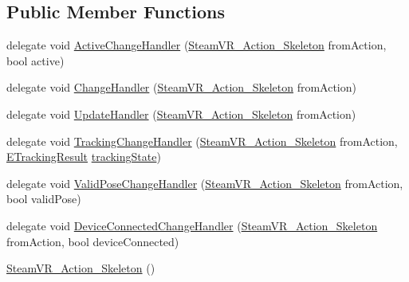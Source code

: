 \subsection*{Public Member Functions}
\begin{DoxyCompactItemize}
\item 
delegate void \mbox{\hyperlink{class_valve_1_1_v_r_1_1_steam_v_r___action___skeleton_ae329ff2582f41c7ec52ecdf3b34b345a}{Active\+Change\+Handler}} (\mbox{\hyperlink{class_valve_1_1_v_r_1_1_steam_v_r___action___skeleton}{Steam\+V\+R\+\_\+\+Action\+\_\+\+Skeleton}} from\+Action, bool active)
\item 
delegate void \mbox{\hyperlink{class_valve_1_1_v_r_1_1_steam_v_r___action___skeleton_a41a68545cb313ef9f47600d9e9022177}{Change\+Handler}} (\mbox{\hyperlink{class_valve_1_1_v_r_1_1_steam_v_r___action___skeleton}{Steam\+V\+R\+\_\+\+Action\+\_\+\+Skeleton}} from\+Action)
\item 
delegate void \mbox{\hyperlink{class_valve_1_1_v_r_1_1_steam_v_r___action___skeleton_a9fd666c2f3ccefc435275d85c525337c}{Update\+Handler}} (\mbox{\hyperlink{class_valve_1_1_v_r_1_1_steam_v_r___action___skeleton}{Steam\+V\+R\+\_\+\+Action\+\_\+\+Skeleton}} from\+Action)
\item 
delegate void \mbox{\hyperlink{class_valve_1_1_v_r_1_1_steam_v_r___action___skeleton_a460bcda41aa359ec14435212bed2b856}{Tracking\+Change\+Handler}} (\mbox{\hyperlink{class_valve_1_1_v_r_1_1_steam_v_r___action___skeleton}{Steam\+V\+R\+\_\+\+Action\+\_\+\+Skeleton}} from\+Action, \mbox{\hyperlink{namespace_valve_1_1_v_r_abe6feab98f33191b7c27b4292012e90a}{E\+Tracking\+Result}} \mbox{\hyperlink{class_valve_1_1_v_r_1_1_steam_v_r___action___pose___base_af04d371ae8e8552385b022d1aa788d32}{tracking\+State}})
\item 
delegate void \mbox{\hyperlink{class_valve_1_1_v_r_1_1_steam_v_r___action___skeleton_af5ad5e815b7f555aa33ee8b74385e89e}{Valid\+Pose\+Change\+Handler}} (\mbox{\hyperlink{class_valve_1_1_v_r_1_1_steam_v_r___action___skeleton}{Steam\+V\+R\+\_\+\+Action\+\_\+\+Skeleton}} from\+Action, bool valid\+Pose)
\item 
delegate void \mbox{\hyperlink{class_valve_1_1_v_r_1_1_steam_v_r___action___skeleton_a737d68e8f67790bf838b4f5bac3ffae1}{Device\+Connected\+Change\+Handler}} (\mbox{\hyperlink{class_valve_1_1_v_r_1_1_steam_v_r___action___skeleton}{Steam\+V\+R\+\_\+\+Action\+\_\+\+Skeleton}} from\+Action, bool device\+Connected)
\item 
\mbox{\hyperlink{class_valve_1_1_v_r_1_1_steam_v_r___action___skeleton_ab6d11fab47009a0f412c17b179749dc5}{Steam\+V\+R\+\_\+\+Action\+\_\+\+Skeleton}} ()

\end{DoxyCompactItemize}
